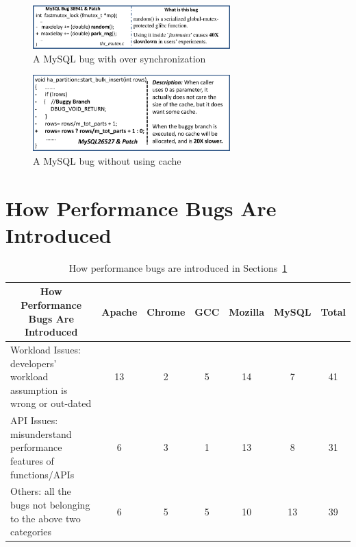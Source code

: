 \begin{figure}[t]
\centering
\includegraphics[width=3in]{figures/mysql38941}
\vspace{0.1in}
\caption{A MySQL bug with over synchronization}
\label{fig:mysql38941}
\end{figure}


\begin{figure}[t]
\centering
\includegraphics[width=3in]{figures/mysql26527}
\vspace{0.1in}
\caption{A MySQL bug without using cache}
\label{fig:mysql26527}
\end{figure}





\section{How Performance Bugs Are Introduced}
\label{sec:char_introduce}

\begin{table}[tb!]
\begin{adjustwidth}{-.5in}{-.5in}
\scriptsize
\centering
{
\begin{tabular}{lcccccc}
\toprule
\multicolumn{1}{c}{\bf How Performance Bugs Are Introduced} &Apache&Chrome&GCC&Mozilla&MySQL&Total\\
\midrule
\multicolumn{1}{l}{Workload Issues: {developers' workload assumption is wrong or out-dated}}
&13&2&5&14&7&41\\
\midrule
\multicolumn{1}{l}{API Issues: {misunderstand performance features of functions/APIs}}
&6&3&1&13&8&31\\
\midrule
\multicolumn{1}{l}{Others: all the bugs not belonging to the above two categories}
&6&5&5&10&13&39\\
\bottomrule

\end{tabular}
}
\end{adjustwidth}
\caption{How performance bugs are introduced in Sections~\ref{sec:char_introduce}}
\label{tab:intro}
\end{table}

